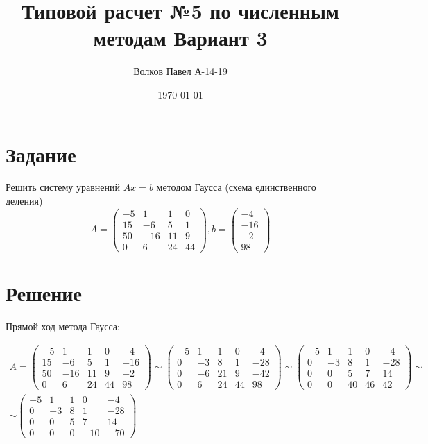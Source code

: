 \documentclass[a4paper,12pt]{report} %
\author{Волков Павел А-14-19}
\title{Типовой расчет №5 по численным методам Вариант 3}
\date{\today}
\begin{document}

\maketitle

\newpage
\section*{Задание}
Решить систему уравнений $Ax = b$ методом Гаусса (схема единственного деления)
\[
	A = 
	\begin{pmatrix}
		-5 & 1 & 1 & 0 \\
		15 & -6 & 5 & 1 \\
		50 & -16 & 11 & 9 \\
		0 & 6 & 24 & 44
	\end{pmatrix}, b = 
	\begin {pmatrix}
		-4 \\ -16 \\ -2 \\ 98
	\end{pmatrix}
\]

\section*{Решение}

Прямой ход метода Гаусса:

\begin{gather*}
	A = 
	\begin{pmatrix}
		-5 & 1 & 1 & 0 & -4\\
		15 & -6 & 5 & 1 & -16\\
		50 & -16 & 11 & 9 & -2\\
		0 & 6 & 24 & 44 & 98
	\end{pmatrix} \sim 
	\begin{pmatrix}
		-5 & 1 & 1 & 0 & -4\\
		0 & -3 & 8 & 1 & -28\\
		0 & -6 & 21 & 9 & -42\\
		0 & 6 & 24 & 44 & 98
	\end{pmatrix} \sim
	\begin{pmatrix}
		-5 & 1 & 1 & 0 & -4\\
		0 & -3 & 8 & 1 & -28\\
		0 & 0 & 5 & 7 & 14\\
		0 & 0 & 40 & 46 & 42
	\end{pmatrix} \sim \\ \sim
	\begin{pmatrix}
		-5 & 1 & 1 & 0 & -4\\
		0 & -3 & 8 & 1 & -28\\
		0 & 0 & 5 & 7 & 14\\
		0 & 0 & 0 & -10 & -70
	\end{pmatrix}
\end{gather*}
\end{document}
